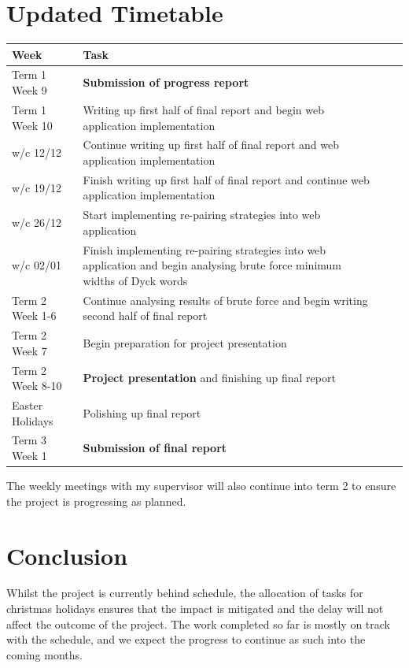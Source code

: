\documentclass[a4paper]{article}
\begin{document}
	\section{Updated Timetable}
	\begin{tabularx}{\textwidth}{|l|X|Xr}
	\hline
	\textbf{Week} & \textbf{Task} \\
	\hline
	Term 1 Week 9 & \textbf{Submission of progress report} \\
	\hline
	Term 1 Week 10 & Writing up first half of final report and begin web application implementation \\
	\hline
	w/c 12/12 & Continue writing up first half of final report and web application implementation \\
	\hline
	w/c 19/12 & Finish writing up first half of final report and continue web application implementation \\
	\hline
	w/c 26/12 & Start implementing re-pairing strategies into web application \\
	\hline
	w/c 02/01 & Finish implementing re-pairing strategies into web application and begin analysing brute force minimum widths of Dyck words \\
	\hline
	Term 2 Week 1-6 & Continue analysing results of brute force and begin writing second half of final report \\
	\hline
	Term 2 Week 7 & Begin preparation for project presentation \\ 
	\hline
	Term 2 Week 8-10 & \textbf{Project presentation} and finishing up final report \\
	\hline
	Easter Holidays & Polishing up final report \\
	\hline
	Term 3 Week 1 & \textbf{Submission of final report} \\
	\hline
	\end{tabularx}
	\newline 
	\newline
	The weekly meetings with my supervisor will also continue into term 2 to ensure the project is progressing as planned.
	
	\section{Conclusion}
	Whilst the project is currently behind schedule, the allocation of tasks for christmas holidays ensures that the impact is mitigated and the delay will not affect the outcome of the project. The work completed so far is mostly on track with the schedule, and we expect the progress to continue as such into the coming months.
\end{document}

